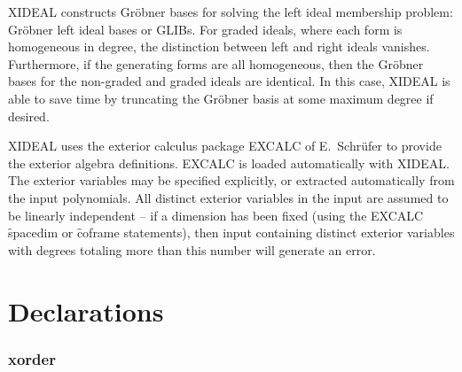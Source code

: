 XIDEAL constructs Gr{\"o}bner bases for solving the left ideal membership
problem: Gr{\"o}bner left ideal bases or GLIBs. For graded ideals, where each
form is homogeneous in degree, the distinction between left and right
ideals vanishes. Furthermore, if the generating forms are all homogeneous,
then the Gr{\"o}bner bases for the non-graded and graded ideals are
identical. In this case, XIDEAL is able to save time by truncating the
Gr{\"o}bner basis at some maximum degree if desired.

XIDEAL uses the exterior calculus package EXCALC of E.~Schr{\"u}fer
\cite{EXCALC} to provide the exterior algebra definitions. EXCALC is loaded
automatically with XIDEAL.
The exterior variables may be specified explicitly, or extracted
automatically from the input polynomials.  All distinct exterior variables
in the input are assumed to be linearly independent -- if a dimension has
been fixed (using the EXCALC \f{spacedim} or \f{coframe} statements), then
input containing distinct exterior variables with degrees totaling more
than this number will generate an error.




\section{Declarations}


\subsubsection*{xorder}

